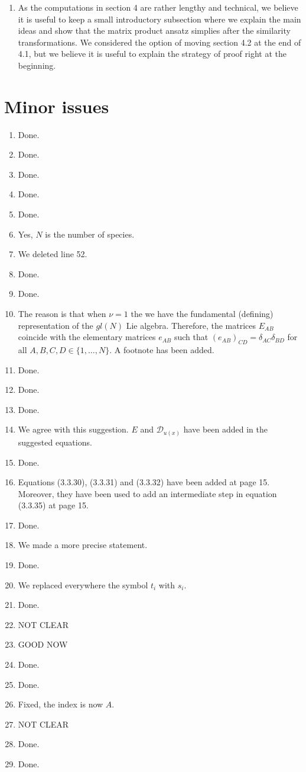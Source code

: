 \documentclass[10pt]{article}
\numberwithin{equation}{section}
\numberwithin{equation}{subsection}
\begin{document}
\begin{enumerate}
						\item 	As the computations in section 4 are rather lengthy and technical, we believe it is useful to keep a small introductory subsection where we explain the main ideas and show that the matrix product ansatz simplies after the similarity transformations.
							We considered the option of moving section 4.2 at the end of 4.1, but we believe it is useful to explain the strategy of proof right at the beginning.							
		\end{enumerate}
		\section*{Minor issues}
		\begin{enumerate}
			\item Done.
			\item Done.
			\item Done.
			\item Done.
			\item Done.
			\item Yes, $N$ is the number of species. 
			\item We deleted line 52.
			\item Done.
			\item Done.
			\item The reason is that when $\nu=1$ the we have the fundamental (defining) representation of the $gl(N)$ Lie algebra. Therefore, the matrices $E_{AB}$ coincide with the elementary matrices $e_{AB}$ such that $(e_{AB})_{CD}=\delta_{AC}\delta_{BD}$ for all $A,B,C,D\in\{1,\ldots,N\}$. A footnote has been added.
			\item Done.
			\item Done.
			\item Done.
			\item We agree with this suggestion. $E$ and $\mathcal{D}_{u(x)}$ have been added in the suggested equations.
			\item Done.
			\item Equations (3.3.30), (3.3.31) and (3.3.32) have been added at page 15. Moreover, they have been used to add an intermediate step in equation (3.3.35) at page 15.
			\item Done.
			\item We made a more precise statement. 
			\item Done.
			\item We replaced everywhere the symbol $t_{i}$ with $s_{i}$.
			\item Done. 
			\item NOT CLEAR
			\item GOOD NOW
			\item Done.
			\item Done.
			\item Fixed, the index is now $A$.
			\item NOT CLEAR
			\item Done.
			\item Done.
		\end{enumerate}
	
\end{document}
